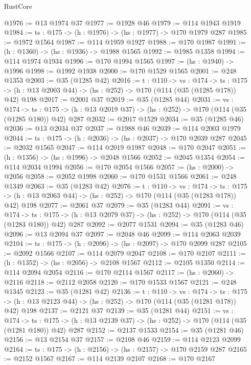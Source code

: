 \begin{lexlean}{RustCore}
\begin{coremodule}
@1976 := @13 @1974 @37
@1977 := @1928 @46
@1979 := @114 @1943 @1919
@1984 := {ts : @175} -> (h : @1976) -> (hs : @1977) -> @170 @1979 @287
@1985 := @1972 @1564
@1987 := @114 @1959 @1927
@1988 := @170 @1987
@1991 := (h : @1360) -> (hs : @1936) -> @1988 @1565
@1992 := @1985 @1358
@1994 := @114 @1974 @1934
@1996 := @170 @1994 @1565
@1997 := (hs : @1940) -> @1996
@1998 := @1992 @1938
@2000 := @170 @1529 @1565
@2001 := @248 @1353
@2003 := @35 (@1285 @42)
@2016 := {t : @110} ->
  {vs : @174} ->
  {ts : @175} -> (h : @13 @2003 @44) -> (hs : @252) -> @170 (@114 (@35 (@1285 @178)) @42) @198
@2017 := @2001 @37
@2019 := @35 (@1285 @44)
@2031 := {vs : @174} ->
  {ts : @175} -> (h : @13 @2019 @37) -> (hs : @252) -> @170 (@114 (@35 (@1285 @180)) @42) @287
@2032 := @2017 @1529
@2034 := @35 (@1285 @46)
@2036 := @13 @2034 @37
@2037 := @1988 @46
@2039 := @114 @2003 @1979
@2044 := {ts : @175} -> (h : @2036) -> (hs : @2037) -> @170 @2039 @287
@2045 := @2032 @1565
@2047 := @114 @2019 @1987
@2048 := @170 @2047
@2051 := (h : @1356) -> (hs : @1996) -> @2048 @1566
@2052 := @2045 @1354
@2054 := @114 @2034 @1994
@2056 := @170 @2054 @1566
@2057 := (hs : @2000) -> @2056
@2058 := @2052 @1998
@2060 := @170 @1531 @1566
@2061 := @248 @1349
@2063 := @35 (@1283 @42)
@2076 := {t : @110} ->
  {vs : @174} ->
  {ts : @175} -> (h : @13 @2063 @44) -> (hs : @252) -> @170 (@114 (@35 (@1283 @178)) @42) @198
@2077 := @2061 @37
@2079 := @35 (@1283 @44)
@2091 := {vs : @174} ->
  {ts : @175} -> (h : @13 @2079 @37) -> (hs : @252) -> @170 (@114 (@35 (@1283 @180)) @42) @287
@2092 := @2077 @1531
@2094 := @35 (@1283 @46)
@2096 := @13 @2094 @37
@2097 := @2048 @46
@2099 := @114 @2063 @2039
@2104 := {ts : @175} -> (h : @2096) -> (hs : @2097) -> @170 @2099 @287
@2105 := @2092 @1566
@2107 := @114 @2079 @2047
@2108 := @170 @2107
@2111 := (h : @1352) -> (hs : @2056) -> @2108 @1567
@2112 := @2105 @1350
@2114 := @114 @2094 @2054
@2116 := @170 @2114 @1567
@2117 := (hs : @2060) -> @2116
@2118 := @2112 @2058
@2120 := @170 @1533 @1567
@2121 := @248 @1345
@2123 := @35 (@1281 @42)
@2136 := {t : @110} ->
  {vs : @174} ->
  {ts : @175} -> (h : @13 @2123 @44) -> (hs : @252) -> @170 (@114 (@35 (@1281 @178)) @42) @198
@2137 := @2121 @37
@2139 := @35 (@1281 @44)
@2151 := {vs : @174} ->
  {ts : @175} -> (h : @13 @2139 @37) -> (hs : @252) -> @170 (@114 (@35 (@1281 @180)) @42) @287
@2152 := @2137 @1533
@2154 := @35 (@1281 @46)
@2156 := @13 @2154 @37
@2157 := @2108 @46
@2159 := @114 @2123 @2099
@2164 := {ts : @175} -> (h : @2156) -> (hs : @2157) -> @170 @2159 @287
@2165 := @2152 @1567
@2167 := @114 @2139 @2107
@2168 := @170 @2167

\end{coremodule}
\end{lexlean}
